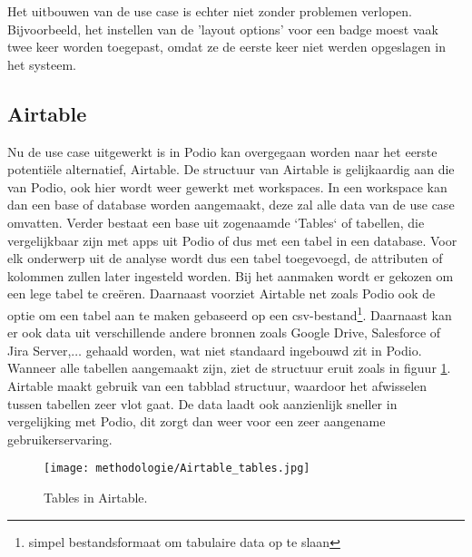 Het uitbouwen van de use case is echter niet zonder problemen verlopen. Bijvoorbeeld, het instellen van de 'layout options' voor een badge moest vaak twee keer worden toegepast, omdat ze de eerste keer niet werden opgeslagen in het systeem. \\

\newpage



\subsection{Airtable}

Nu de use case uitgewerkt is in Podio kan overgegaan worden naar het eerste potentiële alternatief, Airtable. De structuur van Airtable is gelijkaardig aan die van Podio, ook hier wordt weer gewerkt met workspaces. In een workspace kan dan een base of database worden aangemaakt, deze zal alle data van de use case omvatten. Verder bestaat een base uit zogenaamde `Tables` of tabellen, die vergelijkbaar zijn met apps uit Podio of dus met een tabel in een database. Voor elk onderwerp uit de analyse wordt dus een tabel toegevoegd, de attributen of kolommen zullen later ingesteld worden. Bij het aanmaken wordt er gekozen om een lege tabel te creëren. Daarnaast voorziet Airtable net zoals Podio ook de optie om een tabel aan te maken gebaseerd op een csv-bestand\footnote{simpel bestandsformaat om tabulaire data op te slaan}. Daarnaast kan er ook data uit verschillende andere bronnen zoals Google Drive, Salesforce of Jira Server,$\ldots$ gehaald worden, wat niet standaard ingebouwd zit in Podio. \\

Wanneer alle tabellen aangemaakt zijn, ziet de structuur eruit zoals in figuur \ref{fig:meth_airtable_tables}. Airtable maakt gebruik van een tabblad structuur, waardoor het afwisselen tussen tabellen zeer vlot gaat. De data laadt ook aanzienlijk sneller in vergelijking met Podio, dit zorgt dan weer voor een zeer aangename gebruikerservaring. \\

\begin{figure}[h]
    \centering
    \texttt{[image: methodologie/Airtable\_tables.jpg]}
    \caption{Tables in Airtable.}
    \label{fig:meth_airtable_tables}
\end{figure}

